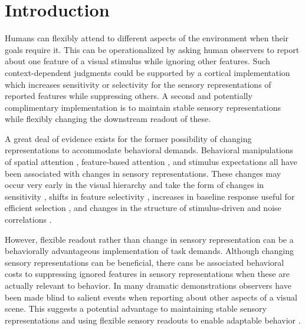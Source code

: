 
\section{Introduction}

Humans can flexibly attend to different aspects of the environment when their goals require it. This can be operationalized by asking human observers to report about one feature of a visual stimulus while ignoring other features. Such context-dependent judgments could be supported by a cortical implementation which increases sensitivity or selectivity for the sensory representations of reported features while suppressing others. A second and potentially complimentary implementation is to maintain stable sensory representations while flexibly changing the downstream readout of these. 

A great deal of evidence exists for the former possibility of changing representations to accommodate behavioral demands. Behavioral manipulations of spatial attention \citep{Klein2014-oe,Mitchell2009-do,Pestilli2011-gi,Womelsdorf2006-np}, feature-based attention \citep{Baldauf2014-uj,Harel2014-wd,Huk2000-uj,Jehee2011-mb,Serences2007-le,Cohen2013-uz,Treue1999-mp}, and stimulus expectations \citep{Kok2012-rh,Kok2013-km} all have been associated with changes in sensory representations. These changes may occur very early in the visual hierarchy \citep{Ling2015-fr} and take the form of changes in sensitivity \citep{Reynolds2000-mg,Serences2007-le,Snyder2018-yr,Treue1999-mp}, shifts in feature selectivity \citep{Cukur2013-gx,David2008-zx,Kastner1998-bi,Klein2014-oe,Spitzer1988-ib,Womelsdorf2006-np,Womelsdorf2008-bm}, increases in baseline response \citep{Buracas2007-pe,Chen2012-ek,Kastner1999-qu,Ress2000-pa,Li2008-fe,Murray2008-xj} useful for efficient selection \citep{Hara2014-tm,Pestilli2011-gi}, and changes in the structure of stimulus-driven and noise correlations \citep{Cohen2010-xs,Cohen2011-pa,Mitchell2009-do,Ruff2016-dv,Verhoef2017-cm}. 

However, flexible readout rather than change in sensory representation can be a behaviorally advantageous implementation of task demands. Although changing sensory representations can be beneficial, there cans be associated behavioral costs to suppressing ignored features in sensory representations \citep{Gazzaley2005-vd,Mesgarani2012-eo,Rees1997-hd} when these are actually relevant to behavior. In many dramatic demonstrations \citep{Haines1991-si,Mack1998-nq,Neisser1979-mm,Simons1999-ng} observers have been made blind to salient events when reporting about other aspects of a visual scene. This suggests a potential advantage to maintaining stable sensory representations and using flexible sensory readouts to enable adaptable behavior \citep{Bugatus2017-wl,Mante2013-tn,Peelen2009-us}.

